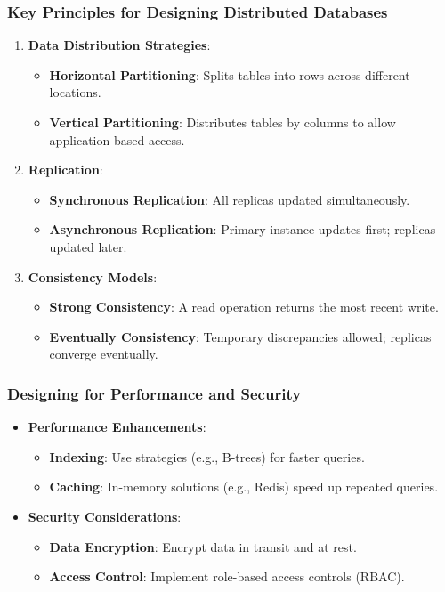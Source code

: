 \documentclass[aspectratio=169]{beamer}
\begin{document}
\begin{frame}[fragile]
    \frametitle{Key Principles for Designing Distributed Databases}
    \begin{enumerate}
        \item \textbf{Data Distribution Strategies}:
            \begin{itemize}
                \item \textbf{Horizontal Partitioning}: Splits tables into rows across different locations.
                \item \textbf{Vertical Partitioning}: Distributes tables by columns to allow application-based access.
            \end{itemize}
        \item \textbf{Replication}:
            \begin{itemize}
                \item \textbf{Synchronous Replication}: All replicas updated simultaneously.
                \item \textbf{Asynchronous Replication}: Primary instance updates first; replicas updated later.
            \end{itemize}
        \item \textbf{Consistency Models}:
            \begin{itemize}
                \item \textbf{Strong Consistency}: A read operation returns the most recent write.
                \item \textbf{Eventually Consistency}: Temporary discrepancies allowed; replicas converge eventually.
            \end{itemize}
    \end{enumerate}
\end{frame}

\begin{frame}[fragile]
    \frametitle{Designing for Performance and Security}
    \begin{itemize}
        \item \textbf{Performance Enhancements}:
            \begin{itemize}
                \item \textbf{Indexing}: Use strategies (e.g., B-trees) for faster queries.
                \item \textbf{Caching}: In-memory solutions (e.g., Redis) speed up repeated queries.
            \end{itemize}
        \item \textbf{Security Considerations}:
            \begin{itemize}
                \item \textbf{Data Encryption}: Encrypt data in transit and at rest.
                \item \textbf{Access Control}: Implement role-based access controls (RBAC).
            \end{itemize}
    \end{itemize}
\end{frame}
\end{document}
